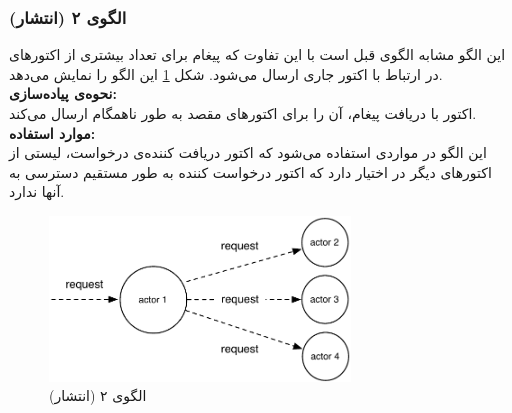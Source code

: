 \subsubsection{الگوی ۲ (انتشار)}
این الگو مشابه الگوی قبل است با این تفاوت که پیغام برای تعداد بیشتری از اکتورهای در ارتباط با اکتور جاری ارسال می‌شود. شکل \ref{fig:Patterns_stateless_broadcast} این الگو را نمایش می‌دهد.\\
\textbf{نحوه‌ی پیاده‌سازی:}\\
اکتور با دریافت پیغام، آن را برای اکتورهای مقصد به طور ناهمگام ارسال می‌کند.\\
\textbf{موارد استفاده:}\\
این الگو در مواردی استفاده می‌شود که اکتور دریافت کننده‌ی درخواست، لیستی از اکتورهای دیگر در اختیار دارد که اکتور درخواست کننده به طور مستقیم دسترسی به آنها ندارد.

\begin{figure}[hb]
    \begin{center}
	\includegraphics[width=8cm]{4-ProposedFramework/Figures/Patterns_stateless_broadcast.pdf}
    \end{center}
    \caption{\label{fig:Patterns_stateless_broadcast}الگوی ۲ (انتشار)}
\end{figure}




